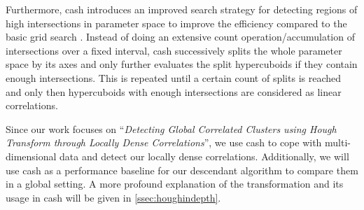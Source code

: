 Furthermore, \gls{cash} introduces an improved search strategy for detecting regions of high intersections in parameter space to improve the efficiency compared to the basic grid search \cite{CASHachtert2008global}. Instead of doing an extensive count operation/accumulation of intersections over a fixed interval, \gls{cash} successively splits the whole parameter space by its axes and only further evaluates the split hypercuboids if they contain enough intersections. This is repeated until a certain count of splits is reached and only then hypercuboids with enough intersections are considered as linear correlations. 

Since our work focuses on ``\textit{Detecting Global Correlated Clusters using Hough Transform through Locally Dense Correlations}'', we use \gls{cash} to cope with multi-dimensional data and detect our locally dense correlations. Additionally, we will use \gls{cash} as a performance baseline for our descendant algorithm to compare them in a global setting.
A more profound explanation of the transformation and its usage in \gls{cash} will be given in \autoref{ssec:houghindepth}.

